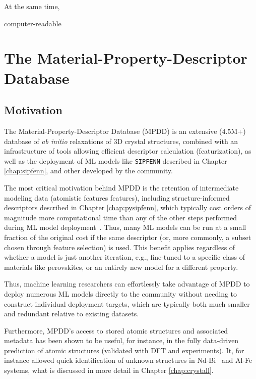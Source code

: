 At the same time, 

computer-readable 








\section{The Material-Property-Descriptor Database} \label{mpdd:sec:mpdd}

\subsection{Motivation} \label{mpdd:ssec:motivation}

The Material-Property-Descriptor Database (MPDD) is an extensive (4.5M+) database of \emph{ab initio} relaxations of 3D crystal structures,  combined with an infrastructure of tools allowing efficient descriptor calculation (featurization), as well as the deployment of ML models like \texttt{SIPFENN} \cite{Krajewski2024EfficientStructures} described in Chapter \ref{chap:sipfenn}, and other developed by the community.

The most critical motivation behind MPDD is the retention of intermediate modeling data (atomistic features features), including structure-informed descriptors described in Chapter \ref{chap:pysipfenn}, which typically cost orders of magnitude more computational time than any of the other steps performed during ML model deployment~\cite{Krajewski2022ExtensibleNetworks}. Thus, many ML models can be run at a small fraction of the original cost if the same descriptor (or, more commonly, a subset chosen through feature selection) is used. This benefit applies regardless of whether a model is just another iteration, e.g., fine-tuned to a specific class of materials like perovskites, or an entirely new model for a different property.

Thus, machine learning researchers can effortlessly take advantage of MPDD to deploy numerous ML models directly to the community without needing to construct individual deployment targets, which are typically both much smaller and redundant relative to existing datasets.

Furthermore, MPDD's access to stored atomic structures and associated metadata has been shown to be useful, for instance, in the fully data-driven prediction of atomic structures (validated with DFT and experiments). It, for instance allowed quick identification of unknown structures in Nd-Bi~\cite{Im2022ThermodynamicModeling} and Al-Fe~\cite{Shang2021FormingJoints} systems, what is discussed in more detail in Chapter \ref{chap:crystall}.

